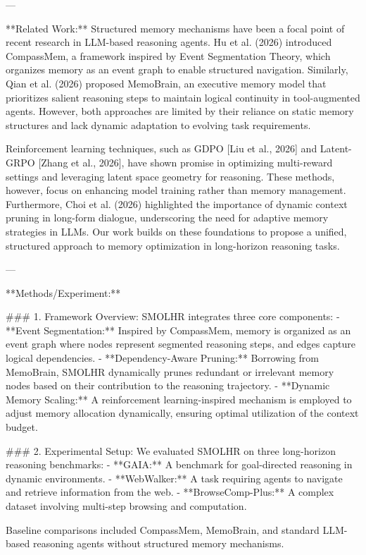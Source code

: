 ---

**Related Work:**  
Structured memory mechanisms have been a focal point of recent research in LLM-based reasoning agents. Hu et al. (2026) introduced CompassMem, a framework inspired by Event Segmentation Theory, which organizes memory as an event graph to enable structured navigation. Similarly, Qian et al. (2026) proposed MemoBrain, an executive memory model that prioritizes salient reasoning steps to maintain logical continuity in tool-augmented agents. However, both approaches are limited by their reliance on static memory structures and lack dynamic adaptation to evolving task requirements.  

Reinforcement learning techniques, such as GDPO [Liu et al., 2026] and Latent-GRPO [Zhang et al., 2026], have shown promise in optimizing multi-reward settings and leveraging latent space geometry for reasoning. These methods, however, focus on enhancing model training rather than memory management. Furthermore, Choi et al. (2026) highlighted the importance of dynamic context pruning in long-form dialogue, underscoring the need for adaptive memory strategies in LLMs. Our work builds on these foundations to propose a unified, structured approach to memory optimization in long-horizon reasoning tasks.  

---

**Methods/Experiment:**  

### 1. Framework Overview:  
SMOLHR integrates three core components:  
- **Event Segmentation:** Inspired by CompassMem, memory is organized as an event graph where nodes represent segmented reasoning steps, and edges capture logical dependencies.  
- **Dependency-Aware Pruning:** Borrowing from MemoBrain, SMOLHR dynamically prunes redundant or irrelevant memory nodes based on their contribution to the reasoning trajectory.  
- **Dynamic Memory Scaling:** A reinforcement learning-inspired mechanism is employed to adjust memory allocation dynamically, ensuring optimal utilization of the context budget.  

### 2. Experimental Setup:  
We evaluated SMOLHR on three long-horizon reasoning benchmarks:  
- **GAIA:** A benchmark for goal-directed reasoning in dynamic environments.  
- **WebWalker:** A task requiring agents to navigate and retrieve information from the web.  
- **BrowseComp-Plus:** A complex dataset involving multi-step browsing and computation.  

Baseline comparisons included CompassMem, MemoBrain, and standard LLM-based reasoning agents without structured memory mechanisms.  


